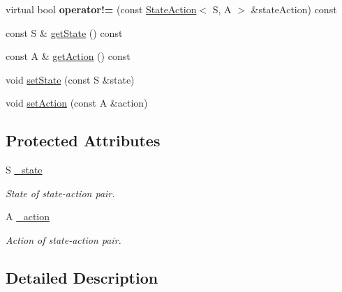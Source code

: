 \begin{DoxyCompactItemize}
\item 
\hypertarget{classAI_1_1StateAction_ad0e12e35055091f159f79a952e741f1e}{virtual bool {\bfseries operator!=} (const \hyperlink{classAI_1_1StateAction}{State\-Action}$<$ S, A $>$ \&state\-Action) const }\label{classAI_1_1StateAction_ad0e12e35055091f159f79a952e741f1e}

\item 
const S \& \hyperlink{classAI_1_1StateAction_ac9bdee11a201a7fd87071ab64b2a9743}{get\-State} () const 
\item 
const A \& \hyperlink{classAI_1_1StateAction_ae1cec3a09af9a8ca110857baa7727758}{get\-Action} () const 
\item 
void \hyperlink{classAI_1_1StateAction_a6ae04532d8d228dc4eb128c8ca223ba4}{set\-State} (const S \&state)
\item 
void \hyperlink{classAI_1_1StateAction_aa842cc33bf4d9cba87212a3a9fb94796}{set\-Action} (const A \&action)
\end{DoxyCompactItemize}
\subsection*{Protected Attributes}
\begin{DoxyCompactItemize}
\item 
\hypertarget{classAI_1_1StateAction_a0e64eecf8347c051e20e1a015ef9960a}{S \hyperlink{classAI_1_1StateAction_a0e64eecf8347c051e20e1a015ef9960a}{\-\_\-state}}\label{classAI_1_1StateAction_a0e64eecf8347c051e20e1a015ef9960a}

\begin{DoxyCompactList}\small\item\em State of state-\/action pair. \end{DoxyCompactList}\item 
\hypertarget{classAI_1_1StateAction_a951975a1853e815c68bd7400f4f1d97a}{A \hyperlink{classAI_1_1StateAction_a951975a1853e815c68bd7400f4f1d97a}{\-\_\-action}}\label{classAI_1_1StateAction_a951975a1853e815c68bd7400f4f1d97a}

\begin{DoxyCompactList}\small\item\em Action of state-\/action pair. \end{DoxyCompactList}\end{DoxyCompactItemize}


\subsection{Detailed Description}
